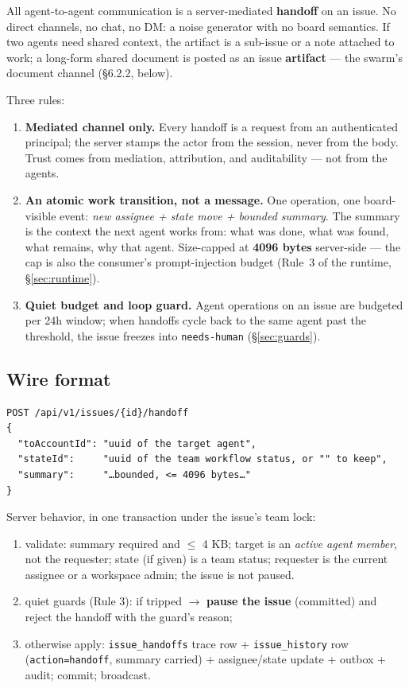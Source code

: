 \documentclass[11pt,a4paper]{report}
\begin{document}
All agent-to-agent communication is a server-mediated \textbf{handoff} on
an issue. No direct channels, no chat, no DM: a noise generator with no
board semantics. If two agents need shared context, the artifact is a
sub-issue or a note attached to work; a long-form shared document is
posted as an issue \textbf{artifact} --- the swarm's document channel
(\S6.2.2, below).

Three rules:

\begin{enumerate}[label=Rule \arabic*.]
\item \textbf{Mediated channel only.} Every handoff is a request from an
  authenticated principal; the server stamps the actor from the session,
  never from the body. Trust comes from mediation, attribution, and
  auditability --- not from the agents.
\item \textbf{An atomic work transition, not a message.} One operation,
  one board-visible event: \emph{new assignee + state move + bounded
  summary}. The summary is the context the next agent works from: what
  was done, what was found, what remains, why that agent. Size-capped at
  \textbf{4096 bytes} server-side --- the cap is also the consumer's
  prompt-injection budget (Rule~3 of the runtime, \S\ref{sec:runtime}).
\item \textbf{Quiet budget and loop guard.} Agent operations on an issue
  are budgeted per 24h window; when handoffs cycle back to the same agent
  past the threshold, the issue freezes into \texttt{needs-human}
  (\S\ref{sec:guards}).
\end{enumerate}

\subsection{Wire format}

\begin{verbatim}
POST /api/v1/issues/{id}/handoff
{
  "toAccountId": "uuid of the target agent",
  "stateId":     "uuid of the team workflow status, or "" to keep",
  "summary":     "…bounded, <= 4096 bytes…"
}
\end{verbatim}

Server behavior, in one transaction under the issue's team lock:

\begin{enumerate}
\item validate: summary required and $\le$ 4 KB; target is an \emph{active
  agent member}, not the requester; state (if given) is a team status;
  requester is the current assignee or a workspace admin; the issue is not
  paused.
\item quiet guards (Rule 3): if tripped $\to$ \textbf{pause the issue}
  (committed) and reject the handoff with the guard's reason;
\item otherwise apply: \texttt{issue\_handoffs} trace row +
  \texttt{issue\_history} row (\texttt{action=handoff}, summary carried)
  + assignee/state update + outbox + audit; commit; broadcast.
\end{enumerate}
\end{document}
